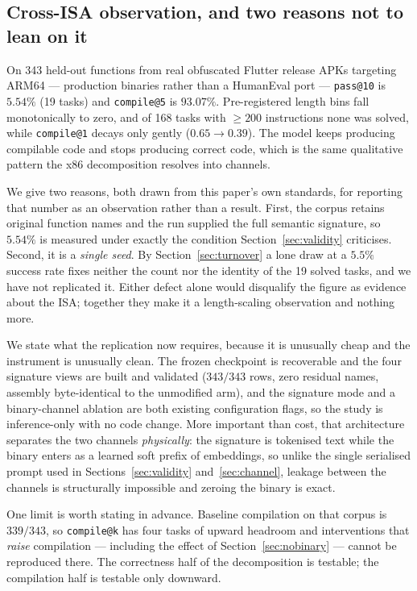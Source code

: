 \documentclass[conference]{IEEEtran}
\makeatletter
\newcommand{\passat}[1]{\texttt{pass@#1}\xspace}
\newcommand{\compileatk}{\texttt{compile@k}\xspace}
\newcommand{\compileat}[1]{\texttt{compile@#1}\xspace}
\makeatother
\begin{document}
\subsection{Cross-ISA observation, and two reasons not to lean on it}
\label{sec:arm64}
On 343 held-out functions from real obfuscated Flutter release APKs targeting
ARM64 --- production binaries rather than a HumanEval port --- \passat{10} is
$5.54\%$ (19 tasks) and \compileat{5} is $93.07\%$. Pre-registered length bins
fall monotonically to zero, and of 168 tasks with ${\geq}200$ instructions none
was solved, while \compileat{1} decays only gently ($0.65\rightarrow0.39$). The
model keeps producing compilable code and stops producing correct code, which is
the same qualitative pattern the x86 decomposition resolves into channels.

We give two reasons, both drawn from this paper's own standards, for reporting
that number as an observation rather than a result. First, the corpus retains
original function names and the run supplied the full semantic signature, so
$5.54\%$ is measured under exactly the condition Section~\ref{sec:validity}
criticises. Second, it is a \emph{single seed}. By Section~\ref{sec:turnover} a
lone draw at a $5.5\%$ success rate fixes neither the count nor the identity of
the 19 solved tasks, and we have not replicated it. Either defect alone would
disqualify the figure as evidence about the ISA; together they make it a
length-scaling observation and nothing more.

We state what the replication now requires, because it is unusually cheap and the
instrument is unusually clean. The frozen checkpoint is recoverable and the four
signature views are built and validated ($343/343$ rows, zero residual names,
assembly byte-identical to the unmodified arm), and the signature mode and a
binary-channel ablation are both existing configuration flags, so the study is
inference-only with no code change. More important than cost, that architecture
separates the two channels \emph{physically}: the signature is tokenised text
while the binary enters as a learned soft prefix of embeddings, so unlike the
single serialised prompt used in Sections~\ref{sec:validity}
and~\ref{sec:channel}, leakage between the channels is structurally impossible
and zeroing the binary is exact.

One limit is worth stating in advance. Baseline compilation on that corpus is
$339/343$, so \compileatk has four tasks of upward headroom and interventions
that \emph{raise} compilation --- including the effect of
Section~\ref{sec:nobinary} --- cannot be reproduced there. The correctness half
of the decomposition is testable; the compilation half is testable only
downward.
\end{document}

